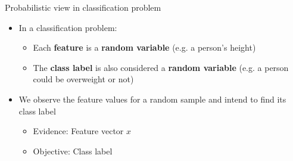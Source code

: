 \documentclass[serif, aspectratio=169]{beamer}
\begin{document}

\begin{frame}{Probabilistic view in classification problem}
    \begin{itemize}
        \item In a classification problem:
            \begin{itemize}
                \item Each \textbf{feature} is a \textbf{random variable} (e.g. a person's height)
                \item The \textbf{class label} is also considered a \textbf{random variable} (e.g. a person could be overweight or not)
            \end{itemize}
        \item We observe the feature values for a random sample and intend to find its class label
            \begin{itemize}
                \item Evidence: Feature vector $x$
                \item Objective: Class label
            \end{itemize}
    \end{itemize}
\end{frame}
\end{document}
